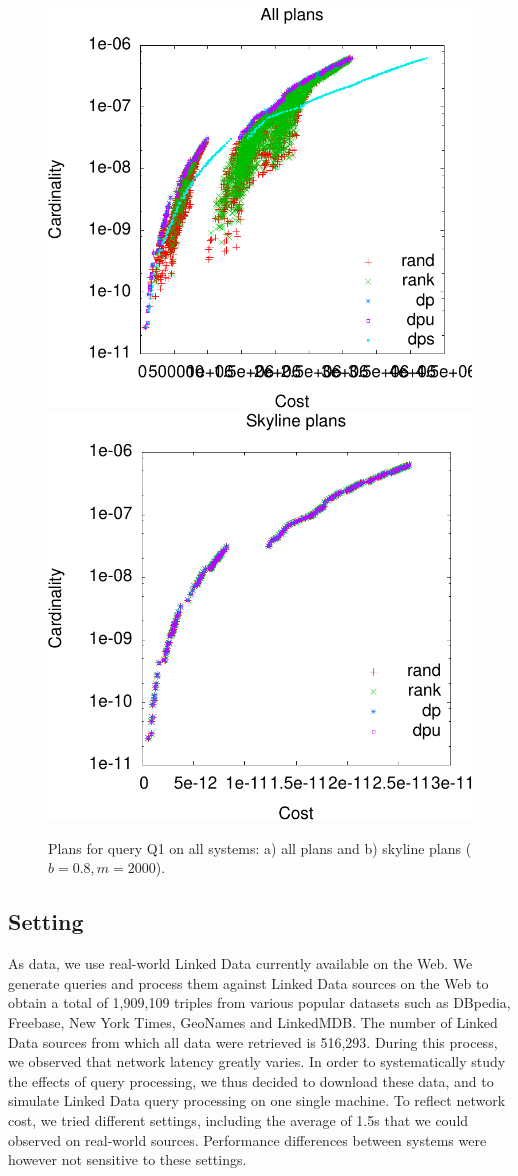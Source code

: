 \begin{figure}[htb]
  \vspace{-0.1cm}
  \centering
  \includegraphics[width=0.48\linewidth]{figs/plans_q2_all-crop.pdf}
  \includegraphics[width=0.48\linewidth]{figs/plans_q2_sky-crop.pdf}
  \caption{Plans for query Q1 on all systems: a) all plans and b)
    skyline plans ($b=0.8,m=2000$).}
  \label{fig:pareto_q2_skyline}
  \vspace{-0.5cm}
\end{figure}

\subsection{Setting} As data, we use real-world Linked Data currently available on the Web. We generate queries and process them against Linked Data sources on the Web to obtain a total of 1,909,109 triples from various popular datasets such as DBpedia, Freebase, New York Times, GeoNames and LinkedMDB. The number of Linked Data sources from which all data were retrieved is 516,293. During this process, we observed that network latency greatly varies. In order to systematically study the effects of query processing, we thus decided to download these data, and to simulate Linked Data query processing on one single machine. To reflect network cost, we tried different settings, including the average of 1.5s that we could observed on real-world sources. Performance differences between systems were however not sensitive to these settings. 

